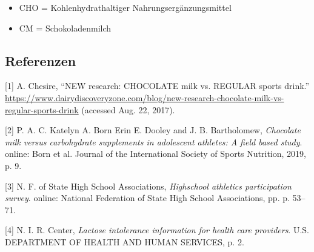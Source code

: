 \documentclass[
]{article}
\providecommand{\tightlist}{%
  \setlength{\itemsep}{0pt}\setlength{\parskip}{0pt}}
\newenvironment{cslreferences}%
  {}%
  {\par}
\begin{document}
\begin{itemize}
\tightlist
\item
  CHO = Kohlenhydrathaltiger Nahrungsergänzungsmittel
\item
  CM = Schokoladenmilch
\end{itemize}

\hypertarget{referenzen}{%
\subsection{Referenzen}\label{referenzen}}

\hypertarget{refs}{}
\begin{cslreferences}
\leavevmode\hypertarget{ref-article}{}%
{[}1{]} A. Chesire, ``NEW research: CHOCOLATE milk vs. REGULAR sports
drink.''
\url{https://www.dairydiscoveryzone.com/blog/new-research-chocolate-milk-vs-regular-sports-drink}
(accessed Aug. 22, 2017).

\leavevmode\hypertarget{ref-study}{}%
{[}2{]} P. A. C. Katelyn A. Born Erin E. Dooley and J. B. Bartholomew,
\emph{Chocolate milk versus carbohydrate supplements in adolescent
athletes: A field based study}. online: Born et al. Journal of the
International Society of Sports Nutrition, 2019, p. 9.

\leavevmode\hypertarget{ref-survey}{}%
{[}3{]} N. F. of State High School Associations, \emph{Highschool
athletics participation survey}. online: National Federation of State
High School Associations, pp. p. 53--71.

\leavevmode\hypertarget{ref-lactose}{}%
{[}4{]} N. I. R. Center, \emph{Lactose intolerance information for
health care providers}. U.S. DEPARTMENT OF HEALTH AND HUMAN SERVICES, p.
2.
\end{cslreferences}
\end{document}
